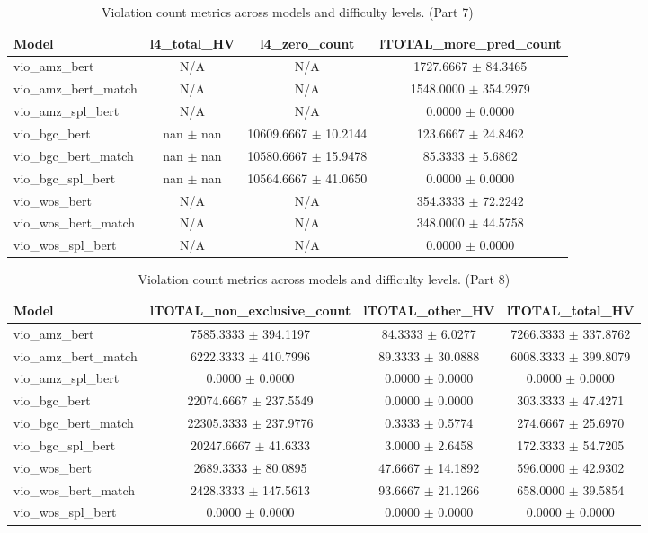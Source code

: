 \begin{table}[htbp]
\centering
\small
\begin{tabular}{lccc}
\toprule
Model & l4_total\_HV & l4_zero\_count & lTOTAL_more\_pred\_count \\
\midrule
vio\_amz\_bert & N/A & N/A & 1727.6667 $\pm$ 84.3465 \\
vio\_amz\_bert\_match & N/A & N/A & 1548.0000 $\pm$ 354.2979 \\
vio\_amz\_spl\_bert & N/A & N/A & 0.0000 $\pm$ 0.0000 \\
vio\_bgc\_bert & nan $\pm$ nan & 10609.6667 $\pm$ 10.2144 & 123.6667 $\pm$ 24.8462 \\
vio\_bgc\_bert\_match & nan $\pm$ nan & 10580.6667 $\pm$ 15.9478 & 85.3333 $\pm$ 5.6862 \\
vio\_bgc\_spl\_bert & nan $\pm$ nan & 10564.6667 $\pm$ 41.0650 & 0.0000 $\pm$ 0.0000 \\
vio\_wos\_bert & N/A & N/A & 354.3333 $\pm$ 72.2242 \\
vio\_wos\_bert\_match & N/A & N/A & 348.0000 $\pm$ 44.5758 \\
vio\_wos\_spl\_bert & N/A & N/A & 0.0000 $\pm$ 0.0000 \\
\bottomrule
\end{tabular}
\caption{Violation count metrics across models and difficulty levels. (Part 7)}
\label{tab:vio_metrics_part7}
\end{table}

\begin{table}[htbp]
\centering
\small
\begin{tabular}{lccc}
\toprule
Model & lTOTAL_non\_exclusive\_count & lTOTAL_other\_HV & lTOTAL_total\_HV \\
\midrule
vio\_amz\_bert & 7585.3333 $\pm$ 394.1197 & 84.3333 $\pm$ 6.0277 & 7266.3333 $\pm$ 337.8762 \\
vio\_amz\_bert\_match & 6222.3333 $\pm$ 410.7996 & 89.3333 $\pm$ 30.0888 & 6008.3333 $\pm$ 399.8079 \\
vio\_amz\_spl\_bert & 0.0000 $\pm$ 0.0000 & 0.0000 $\pm$ 0.0000 & 0.0000 $\pm$ 0.0000 \\
vio\_bgc\_bert & 22074.6667 $\pm$ 237.5549 & 0.0000 $\pm$ 0.0000 & 303.3333 $\pm$ 47.4271 \\
vio\_bgc\_bert\_match & 22305.3333 $\pm$ 237.9776 & 0.3333 $\pm$ 0.5774 & 274.6667 $\pm$ 25.6970 \\
vio\_bgc\_spl\_bert & 20247.6667 $\pm$ 41.6333 & 3.0000 $\pm$ 2.6458 & 172.3333 $\pm$ 54.7205 \\
vio\_wos\_bert & 2689.3333 $\pm$ 80.0895 & 47.6667 $\pm$ 14.1892 & 596.0000 $\pm$ 42.9302 \\
vio\_wos\_bert\_match & 2428.3333 $\pm$ 147.5613 & 93.6667 $\pm$ 21.1266 & 658.0000 $\pm$ 39.5854 \\
vio\_wos\_spl\_bert & 0.0000 $\pm$ 0.0000 & 0.0000 $\pm$ 0.0000 & 0.0000 $\pm$ 0.0000 \\
\bottomrule
\end{tabular}
\caption{Violation count metrics across models and difficulty levels. (Part 8)}
\label{tab:vio_metrics_part8}
\end{table}


